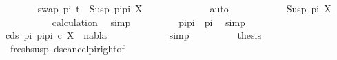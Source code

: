 \begin{isabellebody}
\ \ \ \ \ \ \isamarkupfalse%
\ {\isachardoublequoteopen}swap\ pi\ t\ {\isacharequal}{\kern0pt}\ Susp\ {\isacharparenleft}{\kern0pt}pi{\isacharat}{\kern0pt}pi{}{\isacharparenright}{\kern0pt}\ X{\isachardoublequoteclose}\ \isanewline
\ \ \ \ \ \ \ \ \isamarkupfalse%
\ {\isachardoublequoteopen}{}{\isachardoublequoteclose}{\isacharparenleft}{\kern0pt}{}{\isacharparenright}{\kern0pt}\ \isamarkupfalse%
\ auto\isanewline
\ \ \ \ \ \ \isamarkupfalse%
\ \isamarkupfalse%
\ {\isachardoublequoteopen}{\isachardot}{\kern0pt}{\isachardot}{\kern0pt}{\isachardot}{\kern0pt}\ {\isacharequal}{\kern0pt}\ Susp\ pi{}\ X{\isachardoublequoteclose}\isanewline
\ \ \ \ \ \ \ \ \isamarkupfalse%
\ {}{\isacharparenleft}{\kern0pt}{}{\isacharparenright}{\kern0pt}\ calculation\ \isamarkupfalse%
\ simp\isanewline
\ \ \ \ \ \ \isamarkupfalse%
\ \isamarkupfalse%
\ {\isachardoublequoteopen}pi{\isacharat}{\kern0pt}pi{}\ {\isacharequal}{\kern0pt}\ pi{}{\isachardoublequoteclose}\ \isamarkupfalse%
\ simp\isanewline
\ \ \ \ \ \ \isamarkupfalse%
\ {\isachardoublequoteopen}{\isasymforall}c{\isasymin}ds\ pi{}\ {\isacharparenleft}{\kern0pt}pi{\isacharat}{\kern0pt}pi{}{\isacharparenright}{\kern0pt}{\isachardot}{\kern0pt}\ {\isacharparenleft}{\kern0pt}c{\isacharcomma}{\kern0pt}\ X{\isacharparenright}{\kern0pt}\ {\isasymin}\ nabla{\isachardoublequoteclose}\isanewline
\ \ \ \ \ \ \ \ \isamarkupfalse%
\ {}{\isacharparenleft}{\kern0pt}{}{\isacharparenright}{\kern0pt}\ \isamarkupfalse%
\ simp\isanewline
\ \ \ \ \ \ \isamarkupfalse%
\ \isamarkupfalse%
\ {\isacharquery}{\kern0pt}thesis\ \isanewline
\ \ \ \ \ \ \ \ \isamarkupfalse%
\ {\isachardoublequoteopen}{}{\isachardoublequoteclose}{\isacharparenleft}{\kern0pt}{}{\isacharcomma}{\kern0pt}{}{\isacharparenright}{\kern0pt}\ fresh{\isacharunderscore}{\kern0pt}susp\ ds{\isacharunderscore}{\kern0pt}cancel{\isacharunderscore}{\kern0pt}pi{\isacharunderscore}{\kern0pt}right{\isacharbrackleft}{\kern0pt}of\ {\isacharunderscore}{\kern0pt}\ {\isacharunderscore}{\kern0pt}\ {\isachardoublequoteopen}{\isacharbrackleft}{\kern0pt}{\isacharbrackright}{\kern0pt}{\isachardoublequoteclose}\ {\isacharunderscore}{\kern0pt}{\isacharbrackright}{\kern0pt}\isanewline

\end{isabellebody}
